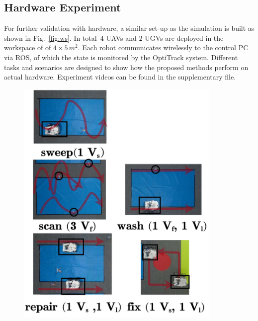 \subsection{Hardware Experiment}\label{subsec:hardware-experiment}
For further validation with hardware,
a similar set-up as the simulation is built as shown in Fig.~\ref{fig:ws}.
In total~$4$ UAVs and $2$ UGVs are deployed in the workspace of of $4\times5\, m^2$.
Each robot communicates wirelessly to the control PC via ROS,
of which the state is monitored by the OptiTrack system.
Different tasks and scenarios are designed to show
how the proposed methods perform on actual hardware.
Experiment videos can be found in the supplementary file.


\begin{figure}[t!]
  \begin{minipage}[t]{0.49\linewidth}
    \centering%
	\includegraphics[width =0.88\textwidth]{figures/hardware_experiment/washing.jpg}
\end{minipage}%
  \begin{minipage}[t]{0.49\linewidth}
    \centering

\end{minipage}
\end{figure}
